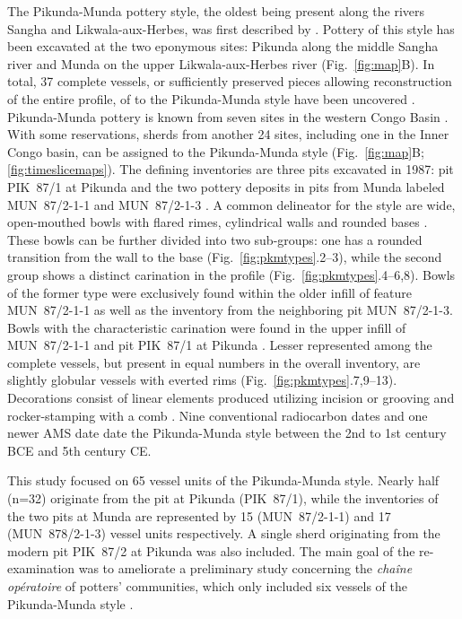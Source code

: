 \documentclass[smallextended,natbib]{svjour3}       %
\begin{document}
The Pikunda-Munda pottery style, the oldest being present along the rivers Sangha and Likwala-aux-Herbes, was first described by \citet{Eggert.1992}. Pottery of this style has been excavated at the two eponymous sites: Pikunda along the middle Sangha river and Munda on the upper Likwala-aux-Herbes river (Fig.~\ref{fig:map}B). In total, 37 complete vessels, or sufficiently preserved pieces allowing reconstruction of the entire profile, of to the Pikunda-Munda style have been uncovered \citep[114--115]{Seidensticker.2021e}. Pikunda-Munda pottery is known from seven sites in the western Congo Basin \citep[119--120 Fig.~49]{Seidensticker.2021e}. With some reservations, sherds from another 24 sites, including one in the Inner Congo basin, can be assigned to the Pikunda-Munda style (Fig.~\ref{fig:map}B; \ref{fig:timeslicemaps}). The defining inventories are three pits excavated in 1987: pit PIK~87/1 at Pikunda \citep[288--300]{Seidensticker.2021e} and the two pottery deposits in pits from Munda labeled MUN~87/2-1-1 and MUN~87/2-1-3 \citep[321--335]{Seidensticker.2021e}. A common delineator for the style are wide, open-mouthed bowls with flared rimes, cylindrical walls and rounded bases \citep[311-314]{Eggert.1993}. These bowls can be further divided into two sub-groups: one has a rounded transition from the wall to the base (Fig.~\ref{fig:pkmtypes}.2--3), while the second group shows a distinct carination in the profile (Fig.~\ref{fig:pkmtypes}.4--6,8). Bowls of the former type were exclusively found within the older infill of feature MUN~87/2-1-1 as well as the inventory from the neighboring pit MUN~87/2-1-3. Bowls with the characteristic carination were found in the upper infill of MUN~87/2-1-1 and pit PIK~87/1 at Pikunda \citep[115--117]{Seidensticker.2021e}. Lesser represented among the complete vessels, but present in equal numbers in the overall inventory, are slightly globular vessels with everted rims (Fig.~\ref{fig:pkmtypes}.7,9--13). Decorations consist of linear elements produced utilizing incision or grooving and rocker-stamping with a comb \citep[362 App.~4.12]{Seidensticker.2021e}. Nine conventional radiocarbon dates \citep[117 Fig.~48, 355--356 App.~2]{Seidensticker.2021e} and one newer AMS date \citep[Tab.~2: RICH-30864]{Seidensticker.Submitted} date the Pikunda-Munda style between the 2nd to 1st century BCE and 5th century CE.

This study focused on 65 vessel units of the Pikunda-Munda style. Nearly half (n=32) originate from the pit at Pikunda (PIK~87/1), while the inventories of the two pits at Munda are represented by 15 (MUN~87/2-1-1) and 17 (MUN~878/2-1-3) vessel units respectively. A single sherd originating from the modern pit PIK~87/2 at Pikunda was also included. The main goal of the re-examination was to ameliorate a preliminary study concerning the \textit{chaîne opératoire} of potters' communities, which only included six vessels of the Pikunda-Munda style \citep[45--73]{Seidensticker.2021e}.
\end{document}
